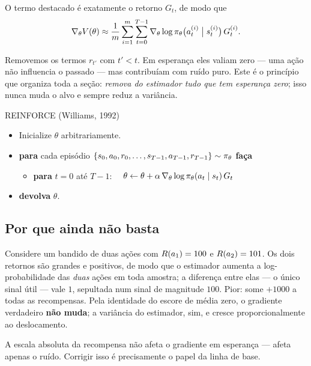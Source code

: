 \documentclass[11pt]{article}
\newcommand{\thv}{\theta}
\newcommand{\polth}{\pol_{\thv}}
\newcommand{\gth}{\nabla_{\thv}}
\begin{document}
O termo destacado é exatamente o retorno $G_t$, de modo que
\begin{equation}\label{eq:temporal}
  \gth V(\thv) \approx \frac{1}{m}\sum_{i=1}^{m}\sum_{t=0}^{T-1}
    \gth\log\polth\bigl(a^{(i)}_t\bigm| s^{(i)}_t\bigr)\, G^{(i)}_t .
\end{equation}

\begin{ideiabox}
Removemos os termos $r_{t'}$ com $t'<t$. Em esperança eles valiam zero --- uma
ação não influencia o passado --- mas contribuíam com ruído puro. Este é o
princípio que organiza toda a seção: \emph{remova do estimador tudo que tem
esperança zero}; isso nunca muda o alvo e sempre reduz a variância.
\end{ideiabox}

\begin{algbox}{REINFORCE (Williams, 1992)}
\begin{itemize}[itemsep=0.1em]
  \item Inicialize $\thv$ arbitrariamente.
  \item \textbf{para} cada episódio
    $\{s_0,a_0,r_0,\dots,s_{T-1},a_{T-1},r_{T-1}\}\sim\polth$ \textbf{faça}
    \begin{itemize}[itemsep=0.05em]
      \item \textbf{para} $t=0$ até $T-1$:
        $\quad \thv \leftarrow \thv + \alpha\,\gth\log\polth(a_t\mid s_t)\,G_t$
    \end{itemize}
  \item \textbf{devolva} $\thv$.
\end{itemize}
\end{algbox}

\subsection{Por que ainda não basta}

Considere um bandido de duas ações com $R(a_1)=100$ e $R(a_2)=101$. Os dois
retornos são grandes e positivos, de modo que o estimador aumenta a
log-probabilidade das \emph{duas} ações em toda amostra; a diferença entre elas
--- o único sinal útil --- vale $1$, sepultada num sinal de magnitude $100$. Pior:
some $+1000$ a todas as recompensas. Pela identidade do escore de média zero, o
gradiente verdadeiro \textbf{não muda}; a variância do estimador, sim, e cresce
proporcionalmente ao deslocamento.

\begin{alertabox}
A escala absoluta da recompensa não afeta o gradiente em esperança --- afeta
apenas o ruído. Corrigir isso é precisamente o papel da linha de base.
\end{alertabox}
\end{document}
